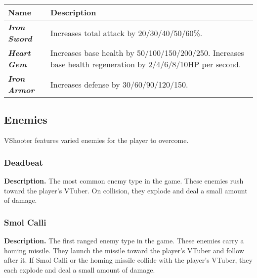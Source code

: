 \documentclass[10pt, a4paper]{article}
\begin{document}
  	\begin{center}
  	\begin{supertabular}{p{2.7cm}p{5.5cm}}
  		\hline
  		\textbf{Name}                & \textbf{Description}                                                                                 \\ \hline
  		\textit{\textbf{Iron Sword}} & Increases total attack by 20/30/40/50/60\%.                                                          \\
  		\textit{\textbf{Heart Gem}}  & Increases base health by 50/100/150/200/250. Increases base health regeneration by 2/4/6/8/10HP per second. \\
  		\textit{\textbf{Iron Armor}}  & Increases defense by 30/60/90/120/150. \\ \hline
  	\end{supertabular}
  	\end{center}
  	
  	\subsection{Enemies} \label{Enemies}

	VShooter features varied enemies for the player to overcome.

	\subsubsection{Deadbeat}

	\textbf{Description.} The most common enemy type in the game. These enemies rush toward the player's VTuber. On collision, they explode and deal a small amount of damage.

	\subsubsection{Smol Calli}

	\textbf{Description.} The first ranged enemy type in the game. These enemies carry a homing missile. They launch the missile toward the player's VTuber and follow after it. If Smol Calli or the homing missile collide with the player's VTuber, they each explode and deal a small amount of damage.

  	
\end{document}
